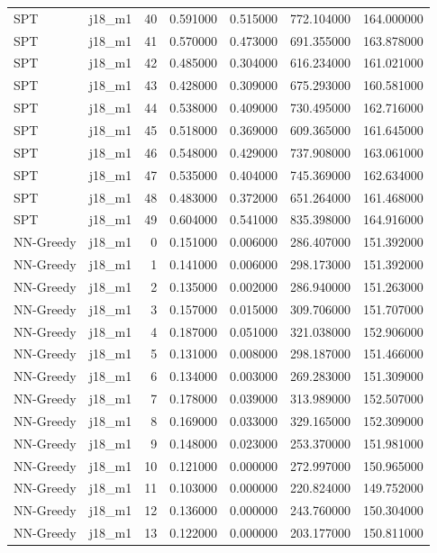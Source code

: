 \begin{tabular}{llrrrrr}
SPT & j18_m1 & 40 & 0.591000 & 0.515000 & 772.104000 & 164.000000 \\
SPT & j18_m1 & 41 & 0.570000 & 0.473000 & 691.355000 & 163.878000 \\
SPT & j18_m1 & 42 & 0.485000 & 0.304000 & 616.234000 & 161.021000 \\
SPT & j18_m1 & 43 & 0.428000 & 0.309000 & 675.293000 & 160.581000 \\
SPT & j18_m1 & 44 & 0.538000 & 0.409000 & 730.495000 & 162.716000 \\
SPT & j18_m1 & 45 & 0.518000 & 0.369000 & 609.365000 & 161.645000 \\
SPT & j18_m1 & 46 & 0.548000 & 0.429000 & 737.908000 & 163.061000 \\
SPT & j18_m1 & 47 & 0.535000 & 0.404000 & 745.369000 & 162.634000 \\
SPT & j18_m1 & 48 & 0.483000 & 0.372000 & 651.264000 & 161.468000 \\
SPT & j18_m1 & 49 & 0.604000 & 0.541000 & 835.398000 & 164.916000 \\
NN-Greedy & j18_m1 & 0 & 0.151000 & 0.006000 & 286.407000 & 151.392000 \\
NN-Greedy & j18_m1 & 1 & 0.141000 & 0.006000 & 298.173000 & 151.392000 \\
NN-Greedy & j18_m1 & 2 & 0.135000 & 0.002000 & 286.940000 & 151.263000 \\
NN-Greedy & j18_m1 & 3 & 0.157000 & 0.015000 & 309.706000 & 151.707000 \\
NN-Greedy & j18_m1 & 4 & 0.187000 & 0.051000 & 321.038000 & 152.906000 \\
NN-Greedy & j18_m1 & 5 & 0.131000 & 0.008000 & 298.187000 & 151.466000 \\
NN-Greedy & j18_m1 & 6 & 0.134000 & 0.003000 & 269.283000 & 151.309000 \\
NN-Greedy & j18_m1 & 7 & 0.178000 & 0.039000 & 313.989000 & 152.507000 \\
NN-Greedy & j18_m1 & 8 & 0.169000 & 0.033000 & 329.165000 & 152.309000 \\
NN-Greedy & j18_m1 & 9 & 0.148000 & 0.023000 & 253.370000 & 151.981000 \\
NN-Greedy & j18_m1 & 10 & 0.121000 & 0.000000 & 272.997000 & 150.965000 \\
NN-Greedy & j18_m1 & 11 & 0.103000 & 0.000000 & 220.824000 & 149.752000 \\
NN-Greedy & j18_m1 & 12 & 0.136000 & 0.000000 & 243.760000 & 150.304000 \\
NN-Greedy & j18_m1 & 13 & 0.122000 & 0.000000 & 203.177000 & 150.811000 \\

\end{tabular}

